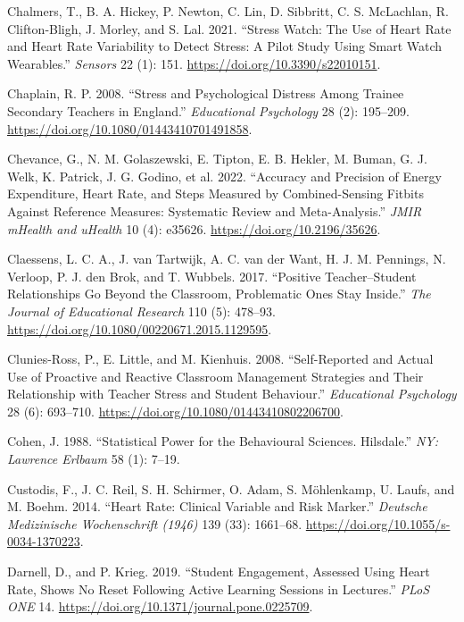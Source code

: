\documentclass[preprint,
3p]{elsarticle} %
\newlength{\cslhangindent}
\newenvironment{CSLReferences}[2] %
 {\begin{list}{}{%
  \setlength{\itemindent}{0pt}
  \setlength{\leftmargin}{0pt}
  \setlength{\parsep}{0pt}
  \ifodd #1
   \setlength{\leftmargin}{\cslhangindent}
   \setlength{\itemindent}{-1\cslhangindent}
  \fi
  \setlength{\itemsep}{#2\baselineskip}}}
 {\end{list}}
\begin{document}
\begin{CSLReferences}{1}{0}
Chalmers, T., B. A. Hickey, P. Newton, C. Lin, D. Sibbritt, C. S.
McLachlan, R. Clifton-Bligh, J. Morley, and S. Lal. 2021. {``Stress
Watch: The Use of Heart Rate and Heart Rate Variability to Detect
Stress: A Pilot Study Using Smart Watch Wearables.''} \emph{Sensors} 22
(1): 151. \url{https://doi.org/10.3390/s22010151}.

Chaplain, R. P. 2008. {``Stress and Psychological Distress Among Trainee
Secondary Teachers in England.''} \emph{Educational Psychology} 28 (2):
195--209. \url{https://doi.org/10.1080/01443410701491858}.

Chevance, G., N. M. Golaszewski, E. Tipton, E. B. Hekler, M. Buman, G.
J. Welk, K. Patrick, J. G. Godino, et al. 2022. {``Accuracy and
Precision of Energy Expenditure, Heart Rate, and Steps Measured by
Combined-Sensing Fitbits Against Reference Measures: Systematic Review
and Meta-Analysis.''} \emph{JMIR mHealth and uHealth} 10 (4): e35626.
\url{https://doi.org/10.2196/35626}.

Claessens, L. C. A., J. van Tartwijk, A. C. van der Want, H. J. M.
Pennings, N. Verloop, P. J. den Brok, and T. Wubbels. 2017. {``Positive
Teacher--Student Relationships Go Beyond the Classroom, Problematic Ones
Stay Inside.''} \emph{The Journal of Educational Research} 110 (5):
478--93. \url{https://doi.org/10.1080/00220671.2015.1129595}.

Clunies-Ross, P., E. Little, and M. Kienhuis. 2008. {``Self-Reported and
Actual Use of Proactive and Reactive Classroom Management Strategies and
Their Relationship with Teacher Stress and Student Behaviour.''}
\emph{Educational Psychology} 28 (6): 693--710.
\url{https://doi.org/10.1080/01443410802206700}.

Cohen, J. 1988. {``Statistical Power for the Behavioural Sciences.
Hilsdale.''} \emph{NY: Lawrence Erlbaum} 58 (1): 7--19.

Custodis, F., J. C. Reil, S. H. Schirmer, O. Adam, S. Möhlenkamp, U.
Laufs, and M. Boehm. 2014. {``Heart Rate: Clinical Variable and Risk
Marker.''} \emph{Deutsche Medizinische Wochenschrift (1946)} 139 (33):
1661--68. \url{https://doi.org/10.1055/s-0034-1370223}.

Darnell, D., and P. Krieg. 2019. {``Student Engagement, Assessed Using
Heart Rate, Shows No Reset Following Active Learning Sessions in
Lectures.''} \emph{PLoS ONE} 14.
\url{https://doi.org/10.1371/journal.pone.0225709}.


\end{CSLReferences}
\end{document}
